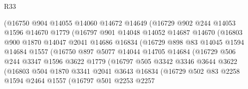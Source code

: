 \begin{lexlean}{R33}
\begin{coremodule}
                    (@16750
                      @904
                      @14055
                      @14060
                      @14672
                      @14649
                      (@16729
                        @902
                        @244
                        @14053
                        @1596
                        @14670
                        @1779
                        (@16797
                          @901
                          @14048
                          @14052
                          @14687
                          @14670
                          (@16803
                            @900
                            @1870
                            @14047
                            @2041
                            @14686
                            @16834
                            (@16729
                              @898
                              @83
                              @14045
                              @1594
                              @14684
                              @1557
                              (@16750
                                @897
                                @5077
                                @14044
                                @14705
                                @14684
                                (@16729
                                  @506
                                  @244
                                  @3347
                                  @1596
                                  @3622
                                  @1779
                                  (@16797
                                    @505
                                    @3342
                                    @3346
                                    @3644
                                    @3622
                                    (@16803
                                      @504
                                      @1870
                                      @3341
                                      @2041
                                      @3643
                                      @16834
                                      (@16729
                                        @502
                                        @83
                                        @2258
                                        @1594
                                        @2464
                                        @1557
                                        (@16797
                                          @501
                                          @2253
                                          @2257

\end{coremodule}
\end{lexlean}
